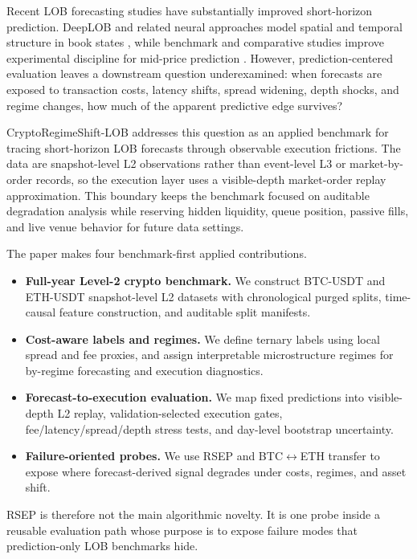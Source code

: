 \documentclass[conference]{IEEEtran}
\begin{document}
Recent LOB forecasting studies have substantially improved short-horizon prediction. DeepLOB and related neural approaches model spatial and temporal structure in book states \cite{deeplob2019,sirignano2019deeplob,zhang2021marketbyorder}, while benchmark and comparative studies improve experimental discipline for mid-price prediction \cite{ntakaris2018benchmark,prata2024lobbenchmark,briola2025lobframe}. However, prediction-centered evaluation leaves a downstream question underexamined: when forecasts are exposed to transaction costs, latency shifts, spread widening, depth shocks, and regime changes, how much of the apparent predictive edge survives?

CryptoRegimeShift-LOB addresses this question as an applied benchmark for tracing short-horizon LOB forecasts through observable execution frictions. The data are snapshot-level L2 observations rather than event-level L3 or market-by-order records, so the execution layer uses a visible-depth market-order replay approximation. This boundary keeps the benchmark focused on auditable degradation analysis while reserving hidden liquidity, queue position, passive fills, and live venue behavior for future data settings.

The paper makes four benchmark-first applied contributions.
\begin{itemize}
\setlength\itemsep{0pt}
\item \textbf{Full-year Level-2 crypto benchmark.} We construct BTC-USDT and ETH-USDT snapshot-level L2 datasets with chronological purged splits, time-causal feature construction, and auditable split manifests.
\item \textbf{Cost-aware labels and regimes.} We define ternary labels using local spread and fee proxies, and assign interpretable microstructure regimes for by-regime forecasting and execution diagnostics.
\item \textbf{Forecast-to-execution evaluation.} We map fixed predictions into visible-depth L2 replay, validation-selected execution gates, fee/latency/spread/depth stress tests, and day-level bootstrap uncertainty.
\item \textbf{Failure-oriented probes.} We use RSEP and BTC$\leftrightarrow$ETH transfer to expose where forecast-derived signal degrades under costs, regimes, and asset shift.
\end{itemize}
RSEP is therefore not the main algorithmic novelty. It is one probe inside a reusable evaluation path whose purpose is to expose failure modes that prediction-only LOB benchmarks hide.
\end{document}
